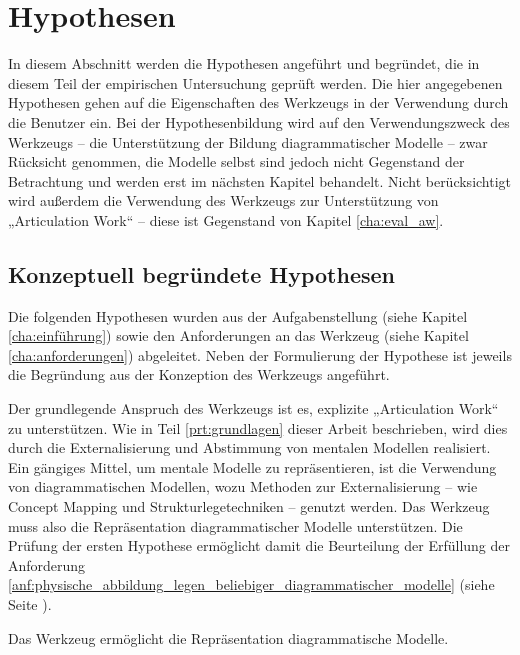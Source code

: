 \section{Hypothesen} %
\label{sec:hypothesen}

In diesem Abschnitt werden die Hypothesen angeführt und begründet, die in diesem Teil der empirischen Untersuchung geprüft werden. Die hier angegebenen Hypothesen gehen auf die Eigenschaften des Werkzeugs in der Verwendung durch die Benutzer ein. Bei der Hypothesenbildung wird auf den Verwendungszweck des Werkzeugs -- die Unterstützung der Bildung diagrammatischer Modelle -- zwar Rücksicht genommen, die Modelle selbst sind jedoch nicht Gegenstand der Betrachtung und werden erst im nächsten Kapitel behandelt. Nicht berücksichtigt wird außerdem die Verwendung des Werkzeugs zur Unterstützung von „Articulation Work“ -- diese ist Gegenstand von Kapitel \ref{cha:eval_aw}.

\subsection{Konzeptuell begründete Hypothesen} %
\label{sub:konzeptuell_begründete_hypothesen}

Die folgenden Hypothesen wurden aus der Aufgabenstellung (siehe Kapitel \ref{cha:einführung}) sowie den Anforderungen an das Werkzeug (siehe Kapitel \ref{cha:anforderungen}) abgeleitet. Neben der Formulierung der Hypothese ist jeweils die Begründung aus der Konzeption des Werkzeugs angeführt.

Der grundlegende Anspruch des Werkzeugs ist es, explizite „Articulation Work“ zu unterstützen. Wie in Teil \ref{prt:grundlagen} dieser Arbeit beschrieben, wird dies durch die Externalisierung und Abstimmung von mentalen Modellen realisiert. Ein gängiges Mittel, um mentale Modelle zu repräsentieren, ist die Verwendung von diagrammatischen Modellen, wozu Methoden zur Externalisierung -- wie Concept Mapping und Strukturlegetechniken -- genutzt werden. Das Werkzeug muss also die Repräsentation diagrammatischer Modelle unterstützen. Die Prüfung der ersten Hypothese ermöglicht damit die Beurteilung der Erfüllung der Anforderung \ref{anf:physische_abbildung_legen_beliebiger_diagrammatischer_modelle} (siehe Seite \pageref{anf:physische_abbildung_legen_beliebiger_diagrammatischer_modelle}). 

\begin{hyp}
	\label{hyp:diagmodelle}
	Das Werkzeug ermöglicht die Repräsentation diagrammatische Modelle.
\end{hyp}

